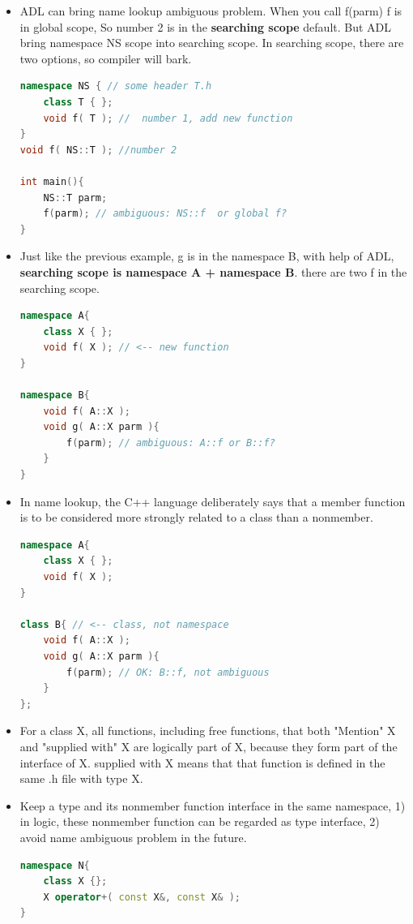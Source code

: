 \documentclass[a4paper,12pt,twoside]{book}
\begin{document}
\begin{itemize}
	\item ADL can bring name lookup ambiguous problem.  When you call f(parm) f is in global scope, So number 2 is in the \textbf{searching scope} default. But ADL bring namespace NS scope into searching scope. In searching scope, there are two options, so compiler will bark.

\begin{lstlisting}[frame=single, language=c++]
namespace NS { // some header T.h
	class T { };
	void f( T ); //  number 1, add new function
}
void f( NS::T ); //number 2
	
int main(){
	NS::T parm;
	f(parm); // ambiguous: NS::f  or global f?
}
	\end{lstlisting}
	
	\item Just like the previous example, g is in the namespace B, with help of ADL, \textbf{searching scope is namespace A + namespace B}. there are two f in the searching scope.
	
\begin{lstlisting}[frame=single, language=c++]
namespace A{
	class X { };
	void f( X ); // <-- new function
}
	
namespace B{
	void f( A::X );
	void g( A::X parm ){
		f(parm); // ambiguous: A::f or B::f?
	}
}
\end{lstlisting}
	
	\item In name lookup, the C++ language deliberately says that a member function is to be considered more strongly related to a class than a nonmember.
	\begin{lstlisting}[frame=single, language=c++]
namespace A{
	class X { };
	void f( X );
}
	
class B{ // <-- class, not namespace
	void f( A::X );
	void g( A::X parm ){
		f(parm); // OK: B::f, not ambiguous
	}
};
	\end{lstlisting}
	
	\item For a class X, all functions, including free functions, that both "Mention" X
	and "supplied with" X are logically part of X, because they form part of the interface of X. supplied with X means that that function is defined in the same .h file with type X. 
	
	\item Keep a type and its nonmember function interface in the same namespace, 1) in logic, these nonmember function can be regarded as type interface, 2) avoid name ambiguous problem in the future.
\begin{lstlisting}[frame=single, language=c++]
namespace N{
	class X {};
	X operator+( const X&, const X& );
}
	

\end{lstlisting}
\end{itemize}
\end{document}
